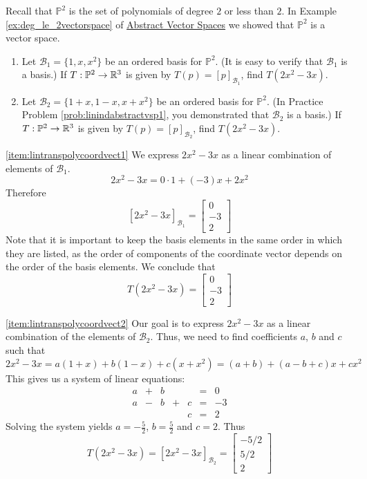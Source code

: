 \documentclass{ximera}
\begin{document}
\begin{example}\label{ex:abstvectsplintranspoly}
Recall that $\mathbb{P}^2$ is the set of polynomials of degree $2$ or less than $2$.  In Example \ref{ex:deg_le_2vectorspace} of \href{\xmbaseurl/VSP-0050/main}{Abstract Vector Spaces} we showed that $\mathbb{P}^2$ is a vector space. 
\begin{enumerate}
    \item \label{item:lintranspolycoordvect1} Let $\mathcal{B}_1=\{1, x, x^{2}\}$ be an ordered basis for $\mathbb{P}^2$.  (It is easy to verify that $\mathcal{B}_1$ is a basis.) If $T:\mathbb{P}^2\rightarrow \mathbb{R}^3$ is given by $T(p)=[p]_{\mathcal{B}_1}$, find $T(2x^2-3x)$.
    \item \label{item:lintranspolycoordvect2}
Let $\mathcal{B}_2=\{1 + x, 1 - x, x + x^{2}\}$ be an ordered basis for $\mathbb{P}^2$. (In Practice Problem \ref{prob:linindabstractvsp1}, you demonstrated that $\mathcal{B}_2$ is a basis.)  If $T:\mathbb{P}^2\rightarrow \mathbb{R}^3$ is given by $T(p)=[p]_{\mathcal{B}_2}$, find $T(2x^2-3x)$.
\end{enumerate}
\begin{explanation}
\ref{item:lintranspolycoordvect1}  We express $2x^2-3x$ as a linear combination of elements of $\mathcal{B}_1$.
$$2x^2-3x=0\cdot 1+ (-3)x+2x^2$$
Therefore $$[2x^2-3x]_{\mathcal{B}_1}=\begin{bmatrix}0\\-3\\2\end{bmatrix}$$
Note that it is important to keep the basis elements in the same order in which they are listed, as the order of components of the coordinate vector depends on the order of the basis elements.  We conclude that
$$T(2x^2-3x)=\begin{bmatrix}0\\-3\\2\end{bmatrix}$$

\ref{item:lintranspolycoordvect2} Our goal is to express $2x^2-3x$ as a linear combination of the elements of $\mathcal{B}_2$.  Thus, we need to find coefficients $a$, $b$ and $c$ such that
$$2x^2-3x=a(1+x)+b(1-x)+c(x+x^2)=(a+b)+(a-b+c)x+cx^2$$
This gives us a system of linear equations:
$$\begin{array}{ccccccc}
      a & +&b&&&= &0 \\
	 a& -&b&+&c&=&-3\\
     & &&&c&=&2
    \end{array}$$
    Solving the system yields $a=-\frac{5}{2}$, $b=\frac{5}{2}$ and $c=2$.  Thus
    $$T(2x^2-3x)=[2x^2-3x]_{\mathcal{B}_2}=\begin{bmatrix}-5/2\\5/2\\2\end{bmatrix}$$
\end{explanation}
\end{example}
\end{document}
